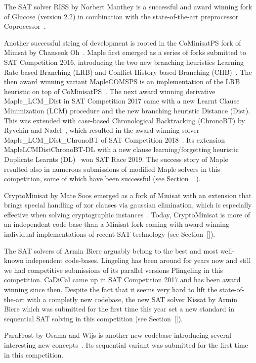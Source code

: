 \documentclass{elsarticle}
\begin{document}
The SAT solver RISS by Norbert Manthey is a successful and award winning fork of Glucose (version 2.2) in combination with the state-of-the-art preprocessor Coprocessor~\cite{}. 

Another successful string of development is rooted in the CoMinisatPS fork of Minisat by Chanseok Oh~\cite{}. 
Maple first emerged as a series of forks submitted to SAT Competition 2016, introducing the two new branching heuristics Learning Rate based Branching (LRB) and Conflict History based Branching (CHB)~\cite{}. 
The then award winning variant MapleCOMSPS is an implementation of the LRB heuristic on top of CoMinisatPS~\cite{}. 
The next award winning derivative Maple\_LCM\_Dist in SAT Competition 2017 came with a new Learnt Clause Minimization (LCM) procedure and the new branching heuristic Distance (Dist). 
This was extended with case-based Chronological Backtracking (ChronoBT) by Ryvchin and Nadel~\cite{}, which resulted in the award winning solver Maple\_LCM\_Dist\_ChronoBT of SAT Competition 2018~\cite{}. 
Its extension MapleLCMDistChronoBT-DL with a new clause learning/forgetting heuristic Duplicate Learnts (DL)~\cite{} won SAT Race 2019. 
The success story of Maple resulted also in numerous submissions of modified Maple solvers in this competition, some of which have been successful (see Section~\ref{}). 

CryptoMinisat by Mate Soos emerged as a fork of Minisat with an extension that brings special handling of xor clauses via gaussian elimination, which is especially effective when solving cryptographic instances~\cite{}. 
Today, CryptoMinisat is more of an independent code base than a Minisat fork coming with award winning individual implementations of recent SAT technology (see Section~\ref{}). 

The SAT solvers of Armin Biere arguably belong to the best and most well-known independent code-bases. 
Lingeling has been around for years now and still we had competitive submissions of its parallel versions Plingeling in this competition. 
CaDiCal came up in SAT Competition 2017 and has been award winning since then. 
Despite the fact that it seems very hard to lift the state-of-the-art with a completly new codebase, the new SAT solver Kissat by Armin Biere which was submitted for the first time this year set a new standard in sequential SAT solving in this competition (see Section~\ref{}). 

ParaFrost by Osama and Wijs is another new codebase introducing several interesting new concepts~\cite{}. 
Its sequential variant was submitted for the first time in this competition. 
\end{document}
